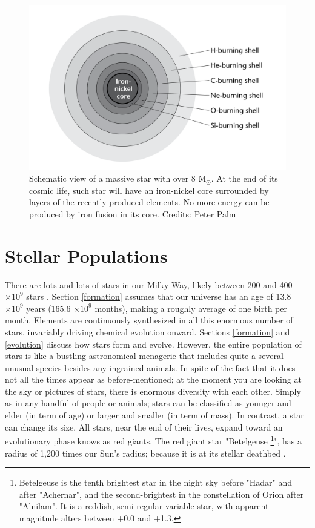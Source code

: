 \begin{figure}[!ht]
\centering
\includegraphics[width=\textwidth, angle=0]{Img/Onion-layer.png}
\caption{Schematic view of a massive star with over 8 M$_{\odot}$. At the end of its cosmic life, such star will have an iron-nickel core surrounded by layers of the recently produced elements. No more energy can be produced by iron fusion in its core. Credits: Peter Palm} 
\label{onion}
\end{figure}
 
\newpage

\section{Stellar Populations}
There are lots and lots of stars in our Milky Way, likely between 200 and 400 $\times 10^{9}$ stars \citep{2006S&T...111e..98R}. Section \ref{formation} assumes that our universe has an age of 13.8 $\times 10^{9}$ years (165.6 $\times 10^{9}$ months), making a roughly average of one birth per month. Elements are continuously synthesized in all this enormous number of stars, invariably driving chemical evolution onward. Sections \ref{formation} and \ref{evolution} discuss how stars form and evolve. However, the entire population of stars is like a bustling astronomical menagerie that includes quite a several unusual species besides any ingrained animals. In spite of the fact that it does not all the times appear as before-mentioned; at the moment you are looking at the sky or pictures of stars, there is enormous diversity with each other. Simply as in any handful of people or animals; stars can be classified as younger and elder (in term of age) or larger and smaller (in term of mass). In contrast, a star can change its size. All stars, near the end of their lives, expand toward an evolutionary phase knows as red giants. The red giant star "Betelgeuse \footnote{Betelgeuse is the tenth brightest star in the night sky before "Hadar" and after "Achernar", and the second-brightest in the constellation of Orion after "Alnilam". It is a reddish, semi-regular variable star, with apparent magnitude alters between +0.0 and +1.3.}", has a radius of 1,200 times our Sun's radius; because it is at its stellar deathbed \citep{2018A&A...609A..67K}. 

